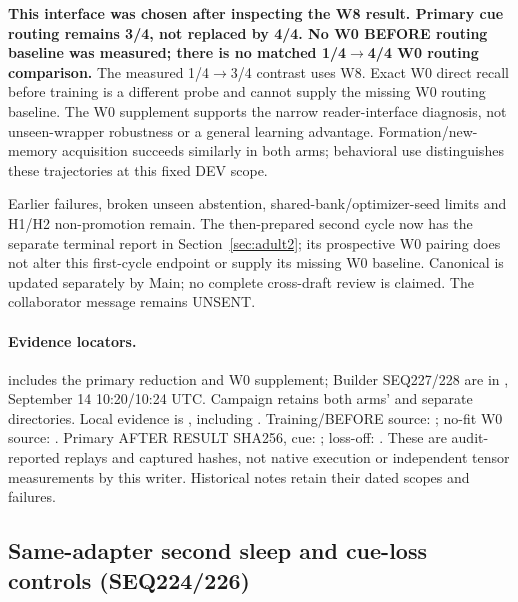 \documentclass[11pt]{article}
\begin{document}
\textbf{This interface was chosen after inspecting the W8 result. Primary cue routing
remains 3/4, not replaced by 4/4. No W0 BEFORE routing baseline was measured;
there is no matched 1/4$\to$4/4 W0 routing comparison.} The measured 1/4$\to$3/4 contrast
uses W8. Exact W0 direct recall before training is a different probe and cannot
supply the missing W0 routing baseline. The W0 supplement supports the narrow
reader-interface diagnosis, not unseen-wrapper robustness or a general learning
advantage. Formation/new-memory acquisition succeeds similarly in both arms;
behavioral use distinguishes these trajectories at this fixed DEV scope.

Earlier failures, broken unseen abstention, shared-bank/optimizer-seed limits
and H1/H2 non-promotion remain. The then-prepared second cycle now has the
separate terminal report in Section~\ref{sec:adult2}; its prospective W0 pairing
does not alter this first-cycle endpoint or supply its missing W0 baseline.
Canonical is updated separately by Main; no complete cross-draft review is
claimed. The collaborator message remains UNSENT.

\paragraph{Evidence locators.}
includes the primary reduction and W0 supplement; Builder SEQ227/228 are in
, September 14 10:20/10:24 UTC.
Campaign  retains both arms'
 and separate  directories.
Local evidence is ,
including . Training/BEFORE source:
; no-fit W0 source:
.
Primary AFTER RESULT SHA256, cue:
;
loss-off: .
These are audit-reported replays and captured hashes, not native execution
or independent tensor measurements by this writer. Historical notes retain
their dated scopes and failures.

\subsection{Same-adapter second sleep and cue-loss controls (SEQ224/226)}
\label{sec:seq224}
\end{document}
